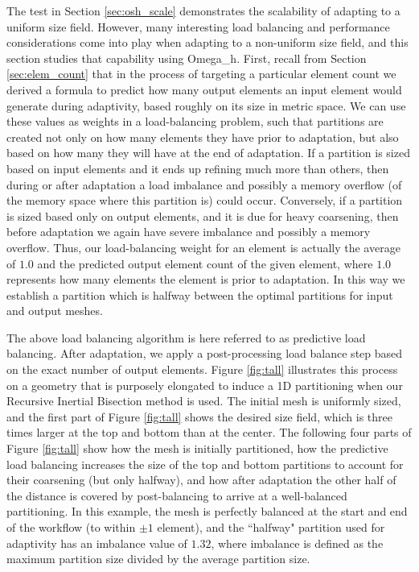 The test in Section \ref{sec:osh_scale} demonstrates the scalability of
adapting to a uniform size field.
However, many interesting load balancing and performance considerations
come into play when adapting to a non-uniform size field,
and this section studies that capability using Omega\_h.
First, recall from Section \ref{sec:elem_count} that in the process
of targeting a particular element count we derived a formula to predict
how many output elements an input element would generate during adaptivity,
based roughly on its size in metric space.
We can use these values as weights in a load-balancing problem, such that
partitions are created not only on how many elements they have prior to
adaptation, but also based on how many they will have at the end of adaptation.
If a partition is sized based on input elements and it ends up refining
much more than others, then during or after adaptation a load imbalance and
possibly a memory overflow (of the memory space where this partition is)
could occur.
Conversely, if a partition is sized based only on output elements, and it
is due for heavy coarsening, then before adaptation we again have severe
imbalance and possibly a memory overflow.
Thus, our load-balancing weight for an element is actually the average of $1.0$
and the predicted output element count of the given element,
where $1.0$ represents how many elements the element is prior to adaptation.
In this way we establish a partition which is halfway between the optimal
partitions for input and output meshes.

The above load balancing algorithm is here referred to as predictive
load balancing.
After adaptation, we apply a post-processing load balance step based
on the exact number of output elements.
Figure \ref{fig:tall} illustrates this process on a geometry that is
purposely elongated to induce a 1D partitioning when our Recursive
Inertial Bisection method is used.
The initial mesh is uniformly sized, and the first part of
Figure \ref{fig:tall} shows the desired size field, which is three
times larger at the top and bottom than at the center.
The following four parts of Figure \ref{fig:tall} show how the mesh
is initially partitioned, how the predictive load balancing increases
the size of the top and bottom partitions to account for their coarsening
(but only halfway), and how after adaptation the other half of the distance
is covered by post-balancing to arrive at a well-balanced partitioning.
In this example, the mesh is perfectly balanced at the start and end
of the workflow (to within $\pm 1$ element), and the ``halfway" partition
used for adaptivity has an imbalance value of $1.32$, where imbalance
is defined as the maximum partition size divided by the average partition size.

